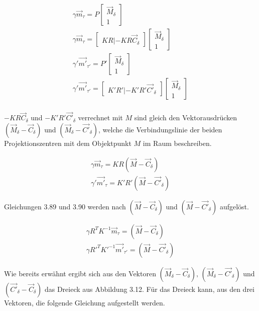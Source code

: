 \begin{gather}
	\gamma\vec{m}_\tau = P \begin{bmatrix}\vec{M}_\delta\\1\end{bmatrix}\\
	\gamma\vec{m}_\tau = \begin{bmatrix}KR|-KR\vec{C}_\delta\end{bmatrix}\begin{bmatrix}\vec{M}_\delta\\1\end{bmatrix}\\
	\gamma'\vec{m'}_{\tau'} = P' \begin{bmatrix}\vec{M}_\delta\\1\end{bmatrix}\\
	\gamma'\vec{m'}_{\tau'} = \begin{bmatrix}K'R'|-K'R'\vec{C'}_\delta\end{bmatrix}\begin{bmatrix}\vec{M}_\delta\\1\end{bmatrix}\\
\end{gather}

$-KR\vec{C}_\delta$ und $-K'R'\vec{C'}_\delta$ verrechnet mit $M$ sind gleich den Vektorausdrücken $(\vec{M}_\delta - \vec{C}_\delta)$ und $(\vec{M}_\delta - \vec{C'}_\delta)$, welche die Verbindungslinie der beiden Projektionszentren mit dem Objektpunkt $M$ im Raum beschreiben.

\begin{gather}
	\gamma\vec{m}_\tau = KR(\vec{M}-\vec{C}_\delta)\\
	\gamma'\vec{m'}_\tau = K'R'(\vec{M}-\vec{C'}_\delta)
\end{gather}

Gleichungen 3.89 und 3.90 werden nach $(\vec{M}-\vec{C}_\delta)$ und $(\vec{M}-\vec{C'}_\delta)$ aufgelöst.

\begin{gather}
	\gamma R^TK^{-1}\vec{m}_\tau = (\vec{M}-\vec{C}_\delta)\\
	\gamma R'^TK'^{-1}\vec{m'}_{\tau'} = (\vec{M}-\vec{C'}_\delta)
\end{gather}

Wie bereits erwähnt ergibt sich aus den Vektoren $(\vec{M}_\delta - \vec{C}_\delta),\, (\vec{M}_\delta - \vec{C'}_\delta)$ und $(\vec{C'}_\delta - \vec{C}_\delta)$ das Dreieck aus Abbildung 3.12. Für das Dreieck kann, aus den drei Vektoren, die folgende Gleichung aufgestellt werden. 

